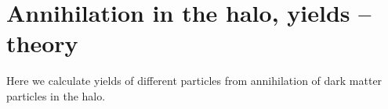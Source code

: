 \section{Annihilation in the halo, yields -- theory}

Here we calculate yields of different particles from annihilation of dark matter particles in the halo.



